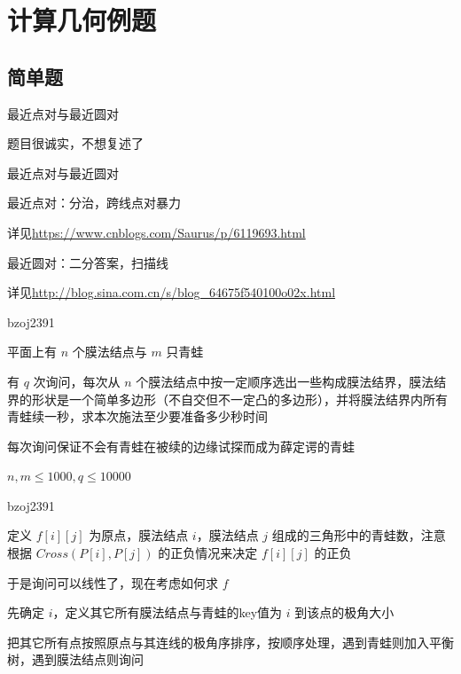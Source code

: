 \documentclass[UTF8]{beamer}
\begin{document}
	\section{计算几何例题}

		\subsection{简单题}

			\begin{frame}{最近点对与最近圆对}

			题目很诚实，不想复述了

			\end{frame}

			\begin{frame}{最近点对与最近圆对}

			最近点对：分治，跨线点对暴力

			详见\url{https://www.cnblogs.com/Saurus/p/6119693.html}

			最近圆对：二分答案，扫描线

			详见\url{http://blog.sina.com.cn/s/blog_64675f540100o02x.html}

			\end{frame}

			\begin{frame}{bzoj2391}

			平面上有 $n$ 个膜法结点与 $m$ 只青蛙

			有 $q$ 次询问，每次从 $n$ 个膜法结点中按一定顺序选出一些构成膜法结界，膜法结界的形状是一个简单多边形（不自交但不一定凸的多边形），并将膜法结界内所有青蛙续一秒，求本次施法至少要准备多少秒时间

			每次询问保证不会有青蛙在被续的边缘试探而成为薛定谔的青蛙

			$n,m \le 1000, q \le 10000$

			\end{frame}

			\begin{frame}{bzoj2391}

			定义 $f[i][j]$ 为原点，膜法结点 $i$，膜法结点 $j$ 组成的三角形中的青蛙数，注意根据 $Cross(P[i],P[j])$ 的正负情况来决定 $f[i][j]$ 的正负

			于是询问可以线性了，现在考虑如何求 $f$

			先确定 $i$，定义其它所有膜法结点与青蛙的key值为 $i$ 到该点的极角大小

			把其它所有点按照原点与其连线的极角序排序，按顺序处理，遇到青蛙则加入平衡树，遇到膜法结点则询问

			\end{frame}
\end{document}
